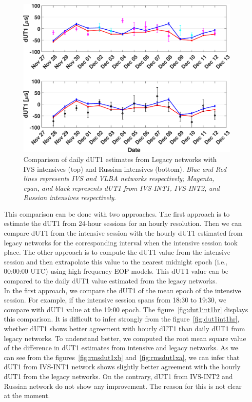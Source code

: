 \documentclass[smallextended]{svjour3}       %
\begin{document}
\begin{figure}[h]
    \centering
    \includegraphics[scale=.28]{dut11day.eps}
    \caption{Comparison of daily dUT1 estimates from Legacy networks with IVS intensives (top) and Russian intensives (bottom). \textit{Blue and Red lines represents IVS and VLBA networks respectively; Magenta, cyan, and black represents dUT1 from IVS-INT1, IVS-INT2, and Russian intensives respectively}.}
    \label{fig:dut1int}
\end{figure}
This comparison can be done with two approaches. The first approach is to estimate the dUT1 from 24-hour sessions for an hourly resolution. Then we can compare dUT1 from the intensive session with the hourly dUT1 estimated from legacy networks for the corresponding interval when the intensive session took place. The other approach is to compute the dUT1 value from the intensive session and then extrapolate this value to the nearest midnight epoch (i.e., 00:00:00 UTC) using high-frequency EOP models. This dUT1 value can be compared to the daily dUT1 value estimated from the legacy networks. \\
In the first approach, we compare the dUT1 of the mean epoch of the intensive session. For example, if the intensive session spans from 18:30 to 19:30, we compare with dUT1 value at the 19:00 epoch. The figure~\ref{fig:dut1int1hr} displays this comparison. It is difficult to infer strongly from the figure~\ref{fig:dut1int1hr}, whether dUT1 shows better agreement with hourly dUT1 than daily dUT1 from legacy networks. To understand better, we computed the root mean square value of the difference in dUT1 estimates from intensive and legacy networks. As we can see from the figures~\ref{fig:rmsdut1xb} and~\ref{fig:rmsdut1xa}, we can infer that dUT1 from IVS-INT1 network shows slightly better agreement with the hourly dUT1 from the legacy networks. On the contrary, dUT1 from IVS-INT2 and Russian network do not show any improvement. The reason for this is not clear at the moment.
\end{document}
